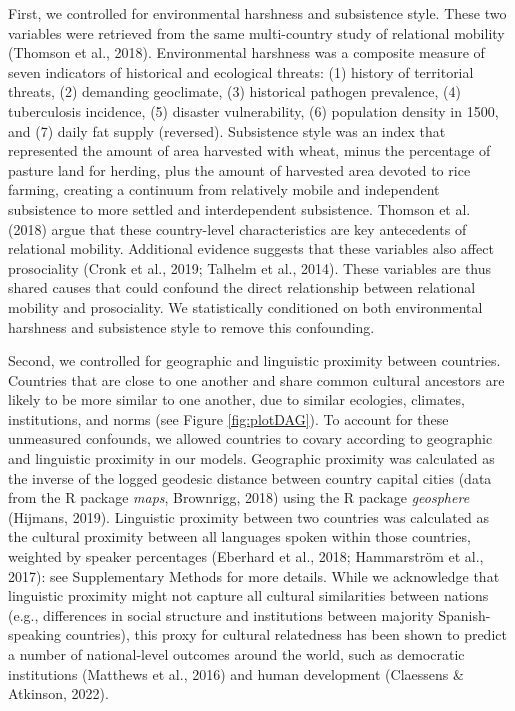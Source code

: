 \documentclass[
  man,floatsintext]{apa6}
\begin{document}
First, we controlled for environmental harshness and subsistence style. These two variables were retrieved from the same multi-country study of relational mobility (Thomson et al., 2018). Environmental harshness was a composite measure of seven indicators of historical and ecological threats: (1) history of territorial threats, (2) demanding geoclimate, (3) historical pathogen prevalence, (4) tuberculosis incidence, (5) disaster vulnerability, (6) population density in 1500, and (7) daily fat supply (reversed). Subsistence style was an index that represented the amount of area harvested with wheat, minus the percentage of pasture land for herding, plus the amount of harvested area devoted to rice farming, creating a continuum from relatively mobile and independent subsistence to more settled and interdependent subsistence. Thomson et al. (2018) argue that these country-level characteristics are key antecedents of relational mobility. Additional evidence suggests that these variables also affect prosociality (Cronk et al., 2019; Talhelm et al., 2014). These variables are thus shared causes that could confound the direct relationship between relational mobility and prosociality. We statistically conditioned on both environmental harshness and subsistence style to remove this confounding.

Second, we controlled for geographic and linguistic proximity between countries. Countries that are close to one another and share common cultural ancestors are likely to be more similar to one another, due to similar ecologies, climates, institutions, and norms (see Figure \ref{fig:plotDAG}). To account for these unmeasured confounds, we allowed countries to covary according to geographic and linguistic proximity in our models. Geographic proximity was calculated as the inverse of the logged geodesic distance between country capital cities (data from the R package \emph{maps}, Brownrigg, 2018) using the R package \emph{geosphere} (Hijmans, 2019). Linguistic proximity between two countries was calculated as the cultural proximity between all languages spoken within those countries, weighted by speaker percentages (Eberhard et al., 2018; Hammarström et al., 2017): see Supplementary Methods for more details. While we acknowledge that linguistic proximity might not capture all cultural similarities between nations (e.g., differences in social structure and institutions between majority Spanish-speaking countries), this proxy for cultural relatedness has been shown to predict a number of national-level outcomes around the world, such as democratic institutions (Matthews et al., 2016) and human development (Claessens \& Atkinson, 2022).
\end{document}
